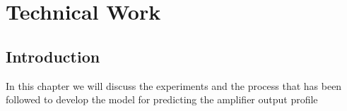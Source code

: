 \chapter{Technical Work}
\label{ch:tw}
\section{Introduction}
In this chapter we will discuss the experiments and the process that has been followed to develop the model for predicting the amplifier output profile